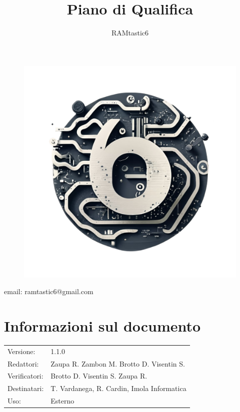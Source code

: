 \documentclass[12pt, oneside]{article}
\author{RAMtastic6}
\begin{document}
\thispagestyle{empty}
\title{Piano di Qualifica}
\maketitle
\begin{figure}[h]
  \centering
  \includegraphics[scale=0.3]{logo.png}
\end{figure}
\begin{center}
    email: ramtastic6@gmail.com
\end{center}

\section*{Informazioni sul documento}
\begin{tabular}{ll}
Versione: & 1.1.0 \\
Redattori: & Zaupa R. Zambon M. Brotto D. Visentin S.\\
Verificatori: & Brotto D. Visentin S. Zaupa R.\\ 
Destinatari: & T. Vardanega, R. Cardin, Imola Informatica \\
Uso: & Esterno
\end{tabular}
\newpage

\end{document}
